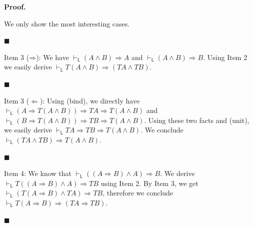 \documentclass[10pt,a4paper]{article}
\begin{document}
 
\par\medskip\noindent\textbf{Proof.}\par
 
 
We only show the most interesting cases.\par
  
\par\noindent  $\blacksquare$ 
 
Item 3 ($\mathbin{\Rightarrow}$): We have $\vdash_{\mathsf{L}}(A\mathbin{\wedge}B)\mathbin{\Rightarrow}A$ and $\vdash_{\mathsf{L}}(A\mathbin{\wedge}B)\mathbin{\Rightarrow}B$. Using Item 2 we easily derive $\vdash_{\mathsf{L}}T(A\mathbin{\wedge}B)\mathbin{\Rightarrow}(TA\mathbin{\wedge}TB)$.\par
 
 
 
\par\noindent  $\blacksquare$ 
 
Item 3 ($\Leftarrow$): Using (bind), we directly have $\vdash_{\mathsf{L}}(A\mathbin{\Rightarrow}T(A\mathbin{\wedge}B))\mathbin{\Rightarrow}TA\mathbin{\Rightarrow}T(A\mathbin{\wedge}B)$ and $\vdash_{\mathsf{L}}(B\mathbin{\Rightarrow}T(A\mathbin{\wedge}B))\mathbin{\Rightarrow}TB\mathbin{\Rightarrow}T(A\mathbin{\wedge}B)$. Using these two facts and (unit), we easily derive $\vdash_{\mathsf{L}}TA\mathbin{\Rightarrow}TB\mathbin{\Rightarrow}T(A\mathbin{\wedge}B)$. We conclude $\vdash_{\mathsf{L}}(TA\mathbin{\wedge}TB)\mathbin{\Rightarrow}T(A\mathbin{\wedge}B)$.\par
 
 
 
\par\noindent  $\blacksquare$ 
 
Item 4: We know that $\vdash_{\mathsf{L}}((A\mathbin{\Rightarrow}B)\mathbin{\wedge}A)\mathbin{\Rightarrow}B$. We derive $\vdash_{\mathsf{L}}T((A\mathbin{\Rightarrow}B)\mathbin{\wedge}A)\mathbin{\Rightarrow}TB$ using Item 2. By Item 3, we get $\vdash_{\mathsf{L}}(T(A\mathbin{\Rightarrow}B)\mathbin{\wedge}TA)\mathbin{\Rightarrow}TB$, therefore we conclude $\vdash_{\mathsf{L}}T(A\mathbin{\Rightarrow}B)\mathbin{\Rightarrow}(TA\mathbin{\Rightarrow}TB)$.\par
 
 
 
\par\noindent  $\blacksquare$ 
 
\end{document}
